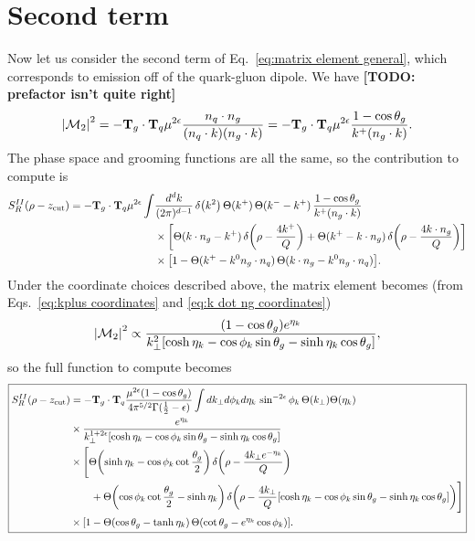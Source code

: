 \documentclass[11pt,twoside,reqno]{amsart}
\theoremstyle{plain}
\theoremstyle{remark}
\theoremstyle{definition}
\theoremstyle{remark}
\theoremstyle{definition}
\theoremstyle{definition}
\newcommand{\cM}{\mathcal{M}}
\newcommand{\zcut}{z_\mathrm{cut}}
\begin{document}
\section{Second term}
	Now let us consider the second term of Eq.~\ref{eq:matrix element general}, which corresponds to emission off of the quark-gluon dipole. We have {\color{red}\textbf{[TODO: prefactor isn't quite right]}} \cite{catani_infrared_2000}
	\begin{equation}
		\abs{\cM_2}^2 = -\vb{T}_g \cdot \vb{T}_q \mu^{2\epsilon} \frac{n_q \cdot n_g}{(n_q \cdot k)(n_g \cdot k)} = -\vb{T}_g \cdot \vb{T}_q \mu^{2\epsilon} \frac{1 - \cos\theta_g}{k^+(n_g \cdot k)}.
	\end{equation}
	The phase space and grooming functions are all the same, so the contribution to compute is
	\begin{equation}\label{eq:soft integral II}
	\begin{aligned}
		S_R^{II}(\rho - \zcut) = -\vb{T}_g \cdot \vb{T}_q\mu^{2\epsilon} \int& \frac{d^d k}{(2\pi)^{d-1}} \, \delta\qty(k^2)\,\Theta(k^+)\,\Theta(k^- - k^+) \,\frac{1 - \cos\theta_g}{k^+(n_g \cdot k)} \\
		&\times \qty[\Theta(k\cdot n_g - k^+)\,\delta\qty(\rho - \frac{4k^+}{Q}) + \Theta(k^+ - k\cdot n_g)\,\delta\qty(\rho - \frac{4k\cdot n_g}{Q})] \\
		&\times \qty[1 - \Theta(k^+ - k^0 n_g \cdot n_q)\,\Theta(k \cdot n_g - k^0 n_g \cdot n_q)].
	\end{aligned}
	\end{equation}
	Under the coordinate choices described above, the matrix element becomes (from Eqs.~\ref{eq:kplus coordinates} and \ref{eq:k dot ng coordinates})
	\begin{equation}
		\abs{\cM_2}^2 \propto \frac{\qty(1 - \cos\theta_g)e^{\eta_k}}{k_\perp^2 \qty[\cosh\eta_k - \cos\phi_k \sin\theta_g - \sinh\eta_k \cos\theta_g]},
	\end{equation}
	so the full function to compute becomes
	\begin{equation}\label{eq:full integral 2}
	\boxed{
	\begin{aligned}
		S_R^{II}(\rho - \zcut) &= -\vb{T}_g \cdot \vb{T}_q\frac{\mu^{2\epsilon}\qty(1 - \cos\theta_g)}{4\pi^{5/2} \Gamma(\frac{1}{2} - \epsilon)}\int dk_\perp d\phi_k d\eta_k\, \sin^{-2\epsilon}\phi_k \, \Theta(k_\perp)\Theta(\eta_k) \\
		&\times\frac{e^{\eta_k}}{k_\perp^{1+2\epsilon} \qty[\cosh\eta_k - \cos\phi_k \sin\theta_g - \sinh\eta_k \cos\theta_g]} \\
		&\times \Bigg[ \Theta\qty(\sinh\eta_k - \cos\phi_k\cot\frac{\theta_g}{2})\,\delta\qty(\rho - \frac{4 k_\perp e^{-\eta_k}}{Q}) \\
			&\qquad+ \Theta\qty(\cos\phi_k\cot\frac{\theta_g}{2} - \sinh\eta_k)\, \delta\qty(\rho - \frac{4 k_\perp}{Q}\qty[\cosh\eta_k - \cos\phi_k\sin\theta_g - \sinh\eta_k\cos\theta_g])\Bigg] \\
			&\times \qty[1 - \Theta(\cos\theta_g - \tanh\eta_k)\,\Theta\qty(\cot\theta_g - e^{\eta_k}\cos\phi_k)].
	\end{aligned}
	}
	\end{equation}
\end{document}
